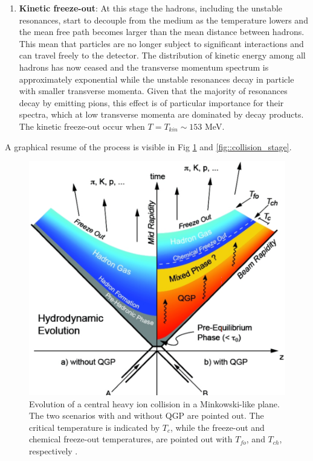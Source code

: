 \documentclass[12pt,a4paper]{book}
\begin{document}
\begin{enumerate}
		\item \textbf{Kinetic freeze-out}: At this stage the hadrons, including the unstable resonances, start to decouple from the medium as the temperature lowers and the mean free path becomes larger than the mean distance between hadrons. This mean that particles are no longer subject to significant interactions and can travel freely to the detector. The distribution of kinetic energy among all hadrons has now ceased and the transverse momentum spectrum is approximately exponential while the unstable resonances decay in particle with smaller transverse momenta. Given that the majority of resonances decay by emitting pions, this effect is of particular importance for their spectra, which at low transverse momenta are dominated by decay products. The kinetic freeze-out occur when $T= T_{kin} \sim 153$ MeV. 

	\end{enumerate}
	A graphical resume of the process is visible in Fig \ref{fig:collision_stage_mikowsky} and \ref{fig::collision_stage}.  
	\begin{figure}[ht]
		\centering
		\includegraphics[width=0.5\linewidth]{pictures/collision_stage_mikowsky.png}
		\caption{Evolution of a central heavy ion collision in a Minkowski-like plane. The two scenarios with and without QGP are pointed out. The critical temperature is indicated by $T_c$, while the freeze-out and chemical freeze-out temperatures, are pointed out with $T_{fo}$, and $T_{ch}$, respectively \cite{EvolutionofcollisionsandQGP}.}
		\label{fig:collision_stage_mikowsky} 
	\end{figure}
	
\end{document}
